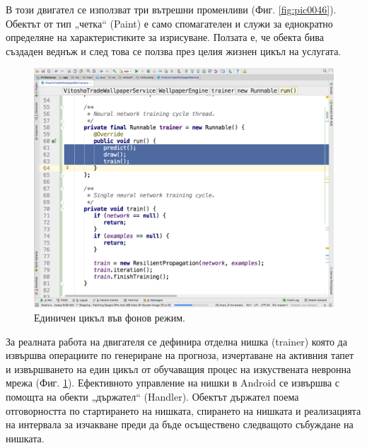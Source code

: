 \documentclass[book,14pt,oneside,openany]{memoir}
\begin{document}
В този двигател се използват три вътрешни променливи (Фиг. \ref{fig:pic0046}). Обектът от тип „четка“ (Paint) е само спомагателен и служи за еднократно определяне на характеристиките за изрисуване. Ползата е, че обекта бива създаден веднъж и след това се ползва през целия жизнен цикъл на услугата. 

\begin{figure}[h]
  \centering
  \includegraphics[height=0.45\pdfpageheight]{pic0047}
  \caption{Единичен цикъл във фонов режим.}
\label{fig:pic0047}
\end{figure}
\FloatBarrier

За реалната работа на двигателя се дефинира отделна нишка (trainer) която да извършва операциите по генериране на прогноза, изчертаване на активния тапет и извършването на един цикъл от обучаващия процес на изкуствената невронна мрежа (Фиг. \ref{fig:pic0047}). Ефективното управление на нишки в Android се извършва с помощта на обекти „държател“ (Handler). Обектът държател поема отговорността по стартирането на нишката, спирането на нишката и реализацията на интервала за изчакване преди да бъде осъществено следващото събуждане на нишката. 
\end{document}

